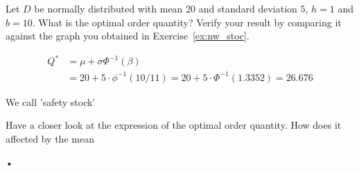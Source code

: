 \begin{question}
Let $D$ be normally distributed with mean 20 and standard deviation 5, $h=1$ and $b=10$. What is the optimal order quantity? Verify your result by comparing it against the graph you obtained in Exercise~\ref{ex:nw_stoc}. 
\end{question}

\begin{solution}
\begin{align*}
Q^* 
& = \mu + \sigma \Phi^{-1}(\beta) \\
& = 20 + 5\cdot \phi^{-1}(10/11) = 20 + 5\cdot \Phi^{-1}(1.3352) = 26.676
\end{align*}
\end{solution}

\begin{question}
We call 'safety stock' 

Have a closer look at the expression of the optimal order quantity. How does it affected by the mean
\end{question}

\begin{solution}
•
\end{solution}

%
%
%



%
%
%
%



